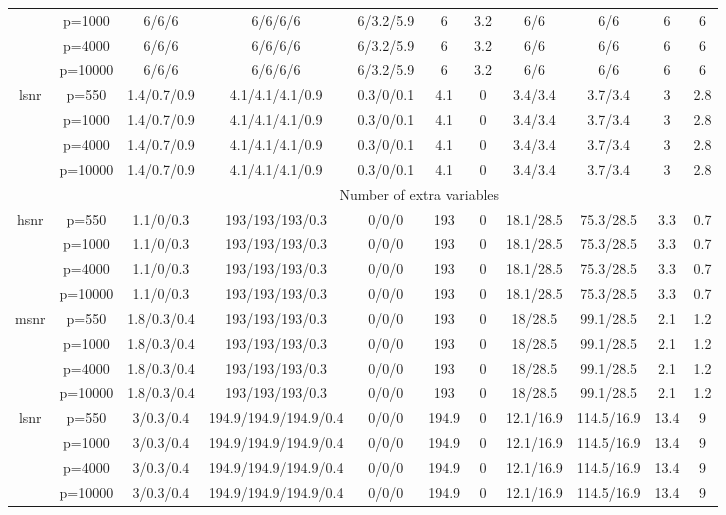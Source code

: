 \begin{table}[ht]
{\begin{tabular}{|c|c|ccccccccc|}
   & p=1000 & 6/6/6 & 6/6/6/6 & 6/3.2/5.9 & 6 & 3.2 & 6/6 & 6/6 & 6 & 6 \\ 
   & p=4000 & 6/6/6 & 6/6/6/6 & 6/3.2/5.9 & 6 & 3.2 & 6/6 & 6/6 & 6 & 6 \\ 
   & p=10000 & 6/6/6 & 6/6/6/6 & 6/3.2/5.9 & 6 & 3.2 & 6/6 & 6/6 & 6 & 6 \\ 
  \midrule\multirow{4}[2]{*}{lsnr} & p=550 & 1.4/0.7/0.9 & 4.1/4.1/4.1/0.9 & 0.3/0/0.1 & 4.1 & 0 & 3.4/3.4 & 3.7/3.4 & 3 & 2.8 \\ 
   & p=1000 & 1.4/0.7/0.9 & 4.1/4.1/4.1/0.9 & 0.3/0/0.1 & 4.1 & 0 & 3.4/3.4 & 3.7/3.4 & 3 & 2.8 \\ 
   & p=4000 & 1.4/0.7/0.9 & 4.1/4.1/4.1/0.9 & 0.3/0/0.1 & 4.1 & 0 & 3.4/3.4 & 3.7/3.4 & 3 & 2.8 \\ 
   & p=10000 & 1.4/0.7/0.9 & 4.1/4.1/4.1/0.9 & 0.3/0/0.1 & 4.1 & 0 & 3.4/3.4 & 3.7/3.4 & 3 & 2.8 \\ 
   \midrule 
 \multicolumn{1}{|c}{} &       & \multicolumn{9}{c|}{Number of extra variables} \\
\midrule\multirow{4}[2]{*}{hsnr} & p=550 & 1.1/0/0.3 & 193/193/193/0.3 & 0/0/0 & 193 & 0 & 18.1/28.5 & 75.3/28.5 & 3.3 & 0.7 \\ 
   & p=1000 & 1.1/0/0.3 & 193/193/193/0.3 & 0/0/0 & 193 & 0 & 18.1/28.5 & 75.3/28.5 & 3.3 & 0.7 \\ 
   & p=4000 & 1.1/0/0.3 & 193/193/193/0.3 & 0/0/0 & 193 & 0 & 18.1/28.5 & 75.3/28.5 & 3.3 & 0.7 \\ 
   & p=10000 & 1.1/0/0.3 & 193/193/193/0.3 & 0/0/0 & 193 & 0 & 18.1/28.5 & 75.3/28.5 & 3.3 & 0.7 \\ 
  \midrule\multirow{4}[2]{*}{msnr} & p=550 & 1.8/0.3/0.4 & 193/193/193/0.3 & 0/0/0 & 193 & 0 & 18/28.5 & 99.1/28.5 & 2.1 & 1.2 \\ 
   & p=1000 & 1.8/0.3/0.4 & 193/193/193/0.3 & 0/0/0 & 193 & 0 & 18/28.5 & 99.1/28.5 & 2.1 & 1.2 \\ 
   & p=4000 & 1.8/0.3/0.4 & 193/193/193/0.3 & 0/0/0 & 193 & 0 & 18/28.5 & 99.1/28.5 & 2.1 & 1.2 \\ 
   & p=10000 & 1.8/0.3/0.4 & 193/193/193/0.3 & 0/0/0 & 193 & 0 & 18/28.5 & 99.1/28.5 & 2.1 & 1.2 \\ 
  \midrule\multirow{4}[2]{*}{lsnr} & p=550 & 3/0.3/0.4 & 194.9/194.9/194.9/0.4 & 0/0/0 & 194.9 & 0 & 12.1/16.9 & 114.5/16.9 & 13.4 & 9 \\ 
   & p=1000 & 3/0.3/0.4 & 194.9/194.9/194.9/0.4 & 0/0/0 & 194.9 & 0 & 12.1/16.9 & 114.5/16.9 & 13.4 & 9 \\ 
   & p=4000 & 3/0.3/0.4 & 194.9/194.9/194.9/0.4 & 0/0/0 & 194.9 & 0 & 12.1/16.9 & 114.5/16.9 & 13.4 & 9 \\ 
   & p=10000 & 3/0.3/0.4 & 194.9/194.9/194.9/0.4 & 0/0/0 & 194.9 & 0 & 12.1/16.9 & 114.5/16.9 & 13.4 & 9 \\ 
   \bottomrule 
\end{tabular}
}
\end{table}
